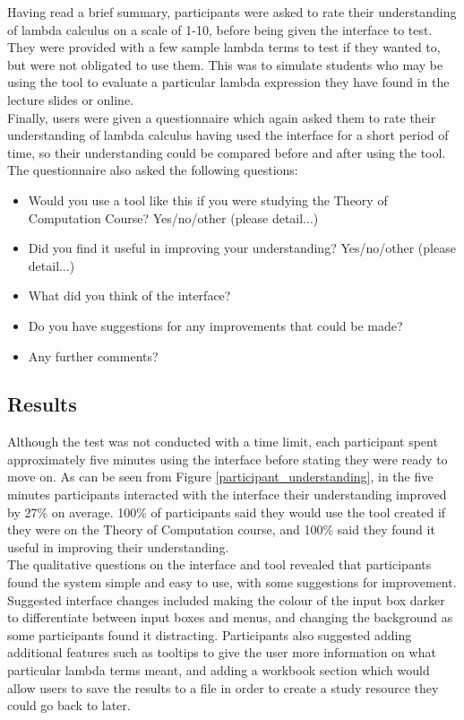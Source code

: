 \documentclass[a4paper,12pt]{report}
\begin{document}
Having read a brief summary, participants were asked to rate their understanding of lambda calculus on a scale of 1-10, before being given the interface to test. They were provided with a few sample lambda terms to test if they wanted to, but were not obligated to use them. This was to simulate students who may be using the tool to evaluate a particular lambda expression they have found in the lecture slides or online.\\

Finally, users were given a questionnaire which again asked them to rate their understanding of lambda calculus having used the interface for a short period of time, so their understanding could be compared before and after using the tool.\\

The questionnaire also asked the following questions:
\begin{itemize}
	\item Would you use a tool like this if you were studying the Theory of Computation Course?
	\subitem Yes/no/other (please detail...)
	\item Did you find it useful in improving your understanding?
	\subitem Yes/no/other (please detail...)
	\item What did you think of the interface?
	\item Do you have suggestions for any improvements that could be made?
	\item Any further comments?
\end{itemize}

\subsection{Results}
Although the test was not conducted with a time limit, each participant spent approximately five minutes using the interface before stating they were ready to move on. As can be seen from Figure \ref{participant_understanding}, in the five minutes participants interacted with the interface their understanding improved by 27\% on average. 100\% of participants said they would use the tool created if they were on the Theory of Computation course, and 100\% said they found it useful in improving their understanding.\\

The qualitative questions on the interface and tool revealed that participants found the system simple and easy to use, with some suggestions for improvement. Suggested interface changes included making the colour of the input box darker to differentiate between input boxes and menus, and changing the background as some participants found it distracting. Participants also suggested adding additional features such as tooltips to give the user more information on what particular lambda terms meant, and adding a workbook section which would allow users to save the results to a file in order to create a study resource they could go back to later.\\
\end{document}

